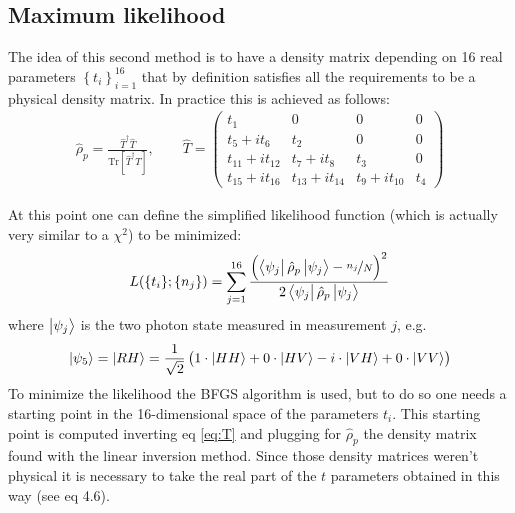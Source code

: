 \documentclass[a4paper, 11pt]{article}
\begin{document}
    \subsection{Maximum likelihood}
      The idea of this second method is to have a density matrix depending on 16 real parameters $\left\{t_i \right\}_{i=1}^{16}$ that by definition satisfies all the requirements to be a physical density matrix. In practice this is achieved as follows:
      \begin{gather} \label{eq:T}
        \hat{\rho}_p = \frac{\hat{T}^\dagger \hat{T}}{\text{Tr}[\hat{T}^\dagger \hat{T}]}, \qquad
        \hat{T} =
        \begin{pmatrix}
          t_1 & 0 & 0 & 0 \\
          t_5 + it_6 & t_2 & 0 & 0 \\
          t_{11} + it_{12} & t_7 + it_8 & t_3 & 0 \\
          t_{15} + it_{16} & t_{13} + it_{14} & t_9 + it_{10} & t_4
        \end{pmatrix}
      \end{gather}

      At this point one can define the simplified likelihood function (which is actually very similar to a $\chi^2$) to be minimized:
      \begin{equation*}
        L(\{t_i\}; \{n_j\}) = \sum_{j=1}^{16} \frac{\left(\bra{\psi_j}\hat{\rho}_p \ket{\psi_j} - \frac[f]{n_j}{N} \right)^2 }{2\bra{\psi_j}\hat{\rho}_p \ket{\psi_j}}
      \end{equation*}
      where $\ket{\psi_j}$ is the two photon state measured in measurement $j$, e.g.
      \begin{equation*}
        \ket{\psi_5} = \ket{RH} = \frac{1}{\sqrt{2}} \left(1\cdot\ket{HH} + 0\cdot\ket{HV} -i\cdot\ket{VH} +0\cdot\ket{VV} \right)
      \end{equation*}
      To minimize the likelihood the BFGS algorithm \cite{rif:bfgs} is used, but to do so one needs a starting point in the 16-dimensional space of the parameters $t_i$. This starting point is computed inverting eq \ref{eq:T} and plugging for $\hat{\rho}_p$ the density matrix found with the linear inversion method. Since those density matrices weren't physical it is necessary to take the real part of the $t$ parameters obtained in this way (see \cite{rif:tomo} eq 4.6).
\end{document}
